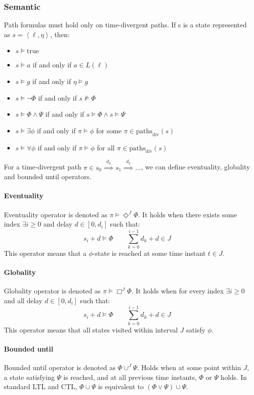 \subsubsection{Semantic}
Path formulas must hold only on time-divergent paths.
If s is a state represented as $s=\left\langle \ell,\eta\right\rangle$, then:
\begin{itemize}
    \item $s\models\text{true}$
    \item $s\models a$ if and only if $a\in L(\ell)$
    \item $s\models g$ if and only if $\eta\models g$
    \item $s\models \lnot\Phi$ if and only if $s\not\models\Phi$
    \item $s\models \Phi\land\Psi$ if and only if $s\models\Phi\land s \models\Psi$
    \item $s\models \exists\phi$ if and only if $\pi\models\phi$ for some $\pi\in\text{paths}_{\text{div}}(s)$
    \item $s\models \forall\phi$ if and only if $\pi\models\phi$ for all $\pi\in\text{paths}_{\text{div}}(s)$
\end{itemize}
For a time-divergent path $\pi\in s_0\overset{d_0}{\implies}s_1\overset{d_2}{\implies}\dots$, we can define eventuality, globality and bounded until operators. 

\paragraph*{Eventuality}
Eventuality operator is denoted as $\pi\models\Diamond^J\Phi$. 
It holds when there exists some index $\exists i \geq 0$ and delay $d\in[0,d_i]$ such that: 
\[s_i+d\models\Phi\qquad \sum_{k=0}^{i-1}d_k+d\in J\]
This operator means that a $\phi$-state is reached at some time instant $t\in J$.

\paragraph*{Globality}
Globality operator is denoted as $\pi\models\Box^J\Phi$. 
It holds when for every index $\exists i \geq 0$ and all delay $d\in[0,d_i]$ such that: 
\[s_i+d\models\Phi\qquad \sum_{k=0}^{i-1}d_k+d\in J\]
This operator means that all states visited within interval $J$ satisfy $\phi$. 

\paragraph*{Bounded until}
Bounded until operator is denoted as $\Phi\cup^J\Psi$. 
Holds when at some point within $J$, a state satisfying $\Psi$ is reached, and at all previous time instants, $\Phi$ or $\Psi$ holds.
In standard LTL and CTL, $\Phi\cup\Psi$ is equivalent to $(\Phi\lor\Psi)\cup\Psi$.

